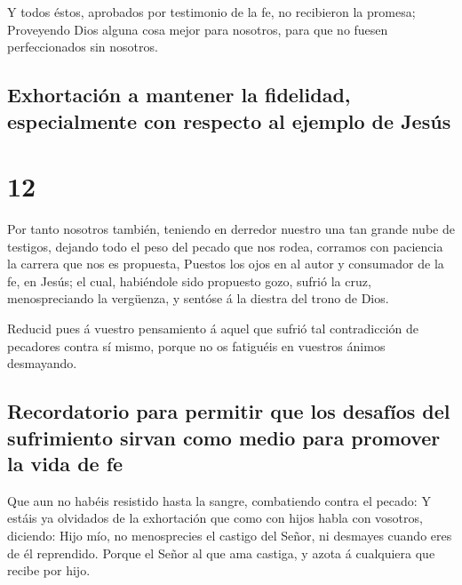  Y todos éstos, aprobados por testimonio de la fe, no
recibieron la promesa;  Proveyendo Dios alguna cosa mejor
para nosotros, para que no fuesen perfeccionados sin nosotros.

\hypertarget{exhortaciuxf3n-a-mantener-la-fidelidad-especialmente-con-respecto-al-ejemplo-de-jesuxfas}{%
\subsection{Exhortación a mantener la fidelidad, especialmente con
respecto al ejemplo de
Jesús}\label{exhortaciuxf3n-a-mantener-la-fidelidad-especialmente-con-respecto-al-ejemplo-de-jesuxfas}}

\hypertarget{section-11}{%
\section{12}\label{section-11}}

 Por tanto nosotros también, teniendo en derredor nuestro
una tan grande nube de testigos, dejando todo el peso del pecado que nos
rodea, corramos con paciencia la carrera que nos es propuesta,
 Puestos los ojos en al autor y consumador de la fe, en
Jesús; el cual, habiéndole sido propuesto gozo, sufrió la cruz,
menospreciando la vergüenza, y sentóse á la diestra del trono de Dios.

 Reducid pues á vuestro pensamiento á aquel que sufrió tal
contradicción de pecadores contra sí mismo, porque no os fatiguéis en
vuestros ánimos desmayando.

\hypertarget{recordatorio-para-permitir-que-los-desafuxedos-del-sufrimiento-sirvan-como-medio-para-promover-la-vida-de-fe}{%
\subsection{Recordatorio para permitir que los desafíos del sufrimiento
sirvan como medio para promover la vida de
fe}\label{recordatorio-para-permitir-que-los-desafuxedos-del-sufrimiento-sirvan-como-medio-para-promover-la-vida-de-fe}}

 Que aun no habéis resistido hasta la sangre, combatiendo
contra el pecado:  Y estáis ya olvidados de la exhortación
que como con hijos habla con vosotros, diciendo: Hijo mío, no
menosprecies el castigo del Señor, ni desmayes cuando eres de él
reprendido.  Porque el Señor al que ama castiga, y azota á
cualquiera que recibe por hijo.

